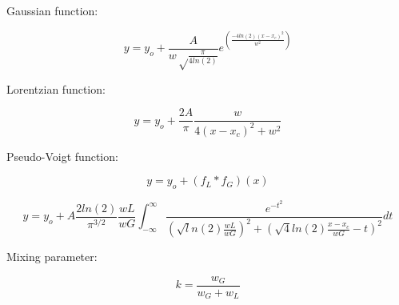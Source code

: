 \documentclass{article}
\begin{document}
Gaussian function:

\begin{equation}
  y = y_{o} + \frac{ A }{ w\sqrt\frac{\pi}{4ln(2)} } e^{(\frac{ -4ln(2)(x-x_{c})^{2} }{ w^{2} })}
\end{equation}

\vspace{3cm}

Lorentzian function:

\begin{equation}
  y = y_{o} + \frac{ 2A }{ \pi } \frac{ w }{ 4(x-x_{c})^{2} + {w}^{2} }
\end{equation}

\vspace{3cm}

Pseudo-Voigt function:

\begin{equation}
  y = y_{o} + (f_{L}*f_{G})(x)
\end{equation}

\begin{equation}
  y = y_{o} + A \frac{ 2ln(2) }{ \pi^{3/2} } \frac{ wL }{ wG } \int_{ -\infty }^{ \infty } \frac{ e^{-t^{2}} }{ (\sqrt ln(2)\frac{ wL }{ wG })^2+(\sqrt 4ln(2)\frac{ x-x_{c} }{ wG }-t)^2 } dt
\end{equation}

\vspace{3cm}

Mixing parameter:

\begin{equation}
  k = \frac{w_{G}}{w_{G} + w_{L}}
\end{equation}
\end{document}
